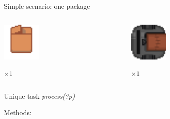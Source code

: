 \begin{frame}[fragile]{Simple scenario: one package}
    \centering
    \begin{columns}
        \begin{column}{0.5\textwidth}
            \centering
            \includegraphics[width = 0.3\textwidth]{images/godot/package.png}
            
            \LARGE \emph{$\times 1$}
        \end{column}
        \begin{column}{0.5\textwidth}
            \centering
            \includegraphics[width = 0.3\textwidth]{images/godot/robot_texture.png}
            
            \LARGE \emph{$\times 1$}
        \end{column}
    \end{columns}
    \pause
    \centering
    Unique task \textit{process(?p)}

    Methods:
    
    ~~



\end{frame}
